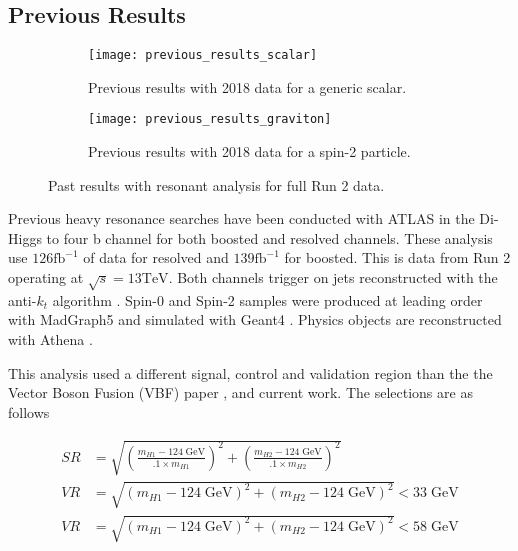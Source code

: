 \documentclass[12pt]{article}
\newcommand{\un}[1]{\;\text{#1}}
\begin{document}
\subsection{Previous Results}
\begin{figure}[t]
    \centering
    \begin{subfigure}[t]{.48\textwidth}
        \centering
        \texttt{[image: previous\_results\_scalar]}
        \caption{Previous results with 2018 data for a generic scalar.}
        \label{subfig:previous_results_scalar}
    \end{subfigure}
    \hfill
    \begin{subfigure}[t]{.48\textwidth}
        \centering
        \texttt{[image: previous\_results\_graviton]}
        \caption{Previous results with 2018 data for a spin-2 particle.}
        \label{subfig:previous_results_graviton}
    \end{subfigure}
\caption{Past results with resonant analysis for full Run 2 data.}
\label{fig:previous_results}
\end{figure}

Previous heavy resonance searches have been conducted with ATLAS in the Di-Higgs
to four b channel for both boosted and resolved channels. These analysis use
$126 \text{fb}^{-1}$ of data for resolved and $139\text{fb}^{-1}$ for boosted.
This is data from Run 2 operating at $\sqrt{s}=13\text{TeV}$. Both channels
trigger on jets reconstructed with the anti-$k_t$ algorithm \cite{antikt}.
Spin-0 and Spin-2 samples were produced at leading order with MadGraph5
\cite{madgraph5_OG} and simulated with Geant4 \cite{geant4}. Physics objects are
reconstructed with Athena \cite{atlas_simulation}.

This analysis used a different signal, control and validation region than the
the Vector Boson Fusion (VBF) paper \cite{vbf_hh4b}, and current work. The
selections are as follows

\begin{align}
    SR &= \sqrt{\left( \frac{m_{H1} - 124\un{GeV}}{.1\times m_{H1} } \right)^2 +
    \left( \frac{m_{H2} - 124\un{GeV}}{.1\times m_{H2}} \right)^2} \\
    VR &= \sqrt{\left( m_{H1} - 124\un{GeV} \right)^2 + \left( m_{H2} -
    124\un{GeV} \right)^2} < 33\un{GeV} \\
    VR &= \sqrt{\left( m_{H1} - 124\un{GeV} \right)^2 + \left( m_{H2} -
    124\un{GeV} \right)^2} < 58\un{GeV}
\end{align}
\end{document}
